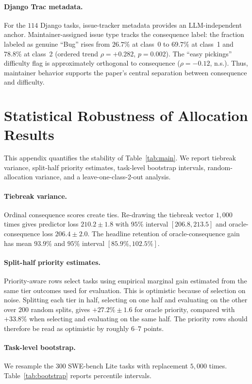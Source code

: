 \documentclass{article}
\begin{document}
\paragraph{Django Trac metadata.}
For the $114$ Django tasks, issue-tracker metadata provides an
LLM-independent anchor. Maintainer-assigned issue type tracks the
consequence label: the fraction labeled as genuine ``Bug'' rises from
$26.7\%$ at class~0 to $69.7\%$ at class~1 and $78.8\%$ at class~2
(ordered trend $\rho=+0.282$, $p=0.002$). The ``easy pickings''
difficulty flag is approximately orthogonal to consequence
($\rho=-0.12$, n.s.). Thus, maintainer behavior supports the paper's
central separation between consequence and difficulty.

\section{Statistical Robustness of Allocation Results}
\label{app:bootstrap}

This appendix quantifies the stability of Table~\ref{tab:main}. We
report tiebreak variance, split-half priority estimates, task-level
bootstrap intervals, random-allocation variance, and a
leave-one-class-2-out analysis.

\paragraph{Tiebreak variance.}
Ordinal consequence scores create ties. Re-drawing the tiebreak vector
$1{,}000$ times gives predictor loss $210.2\pm1.8$ with $95\%$
interval $[206.8,213.5]$ and oracle-consequence loss $206.4\pm2.0$.
The headline retention of oracle-consequence gain has mean $93.9\%$
and $95\%$ interval $[85.9\%,102.5\%]$.

\paragraph{Split-half priority estimates.}
Priority-aware rows select tasks using empirical marginal gain
estimated from the same tier outcomes used for evaluation. This is
optimistic because of selection on noise. Splitting each tier in half,
selecting on one half and evaluating on the other over $200$ random
splits, gives $+27.2\%\pm1.6$ for oracle priority, compared with
$+33.8\%$ when selecting and evaluating on the same half. The priority
rows should therefore be read as optimistic by roughly $6$--$7$ points.

\paragraph{Task-level bootstrap.}
We resample the $300$ SWE-bench Lite tasks with replacement $5{,}000$
times. Table~\ref{tab:bootstrap} reports percentile intervals.
\end{document}
